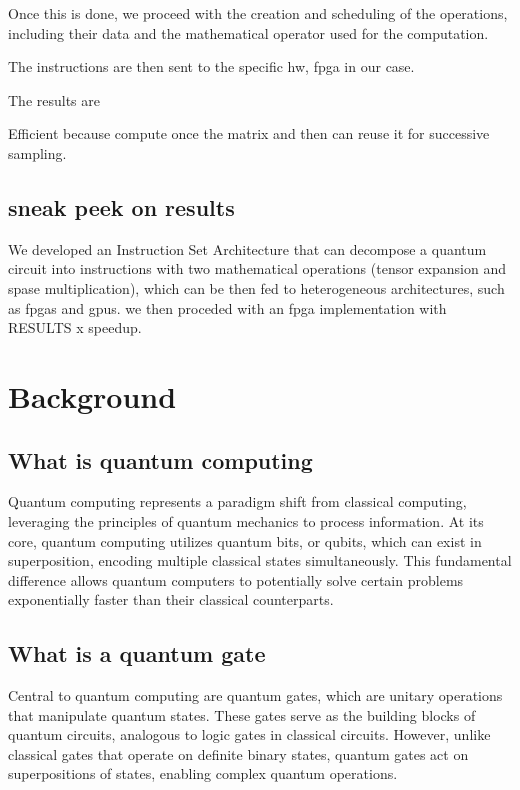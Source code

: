 \documentclass[12pt,oneside,a4paper]{article}
\begin{document}
Once this is done, we proceed with the creation and scheduling of the operations, including their data and the mathematical operator used for the computation.

The instructions are then sent to the specific hw, fpga in our case.

The results are 

Efficient because compute once the matrix and then can reuse it for successive sampling.

\subsection{sneak peek on results}
We developed an Instruction Set Architecture that can decompose a quantum circuit into instructions with two mathematical operations (tensor expansion and spase multiplication), which can be then fed to heterogeneous architectures, such as fpgas and gpus. we then proceded with an fpga implementation with RESULTS x speedup.



\section{Background}

\subsection{What is quantum computing}
Quantum computing represents a paradigm shift from classical computing, leveraging the principles of quantum mechanics to process information. At its core, quantum computing utilizes quantum bits, or qubits, which can exist in superposition, encoding multiple classical states simultaneously. This fundamental difference allows quantum computers to potentially solve certain problems exponentially faster than their classical counterparts.

\subsection{What is a quantum gate}
Central to quantum computing are quantum gates, which are unitary operations that manipulate quantum states. These gates serve as the building blocks of quantum circuits, analogous to logic gates in classical circuits. However, unlike classical gates that operate on definite binary states, quantum gates act on superpositions of states, enabling complex quantum operations.
\end{document}
